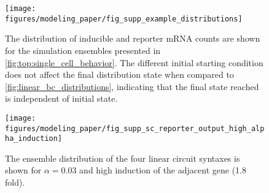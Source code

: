 \documentclass[11pt]{article}
\begin{document}
\begin{figure}[hbtp]
    \centering
    \texttt{[image: figures/modeling\_paper/fig\_supp\_example\_distributions]}
    \caption{The distribution of inducible and reporter mRNA counts are shown for the simulation ensembles presented in \cref{fig:top:single_cell_behavior}. The different initial starting condition does not affect the final distribution state when compared to \cref{fig:linear_bc_distributions}, indicating that the final state reached is independent of initial state.}
    \label{fig:supp:fig_examples_ensemble_behavior}
\end{figure}

\begin{figure}[hbtp]
    \centering
    \texttt{[image: figures/modeling\_paper/fig\_supp\_sc\_reporter\_output\_high\_alpha\_induction]}
    \caption{The ensemble distribution of the four linear circuit syntaxes is shown for \(\alpha = 0.03\) and high induction of the adjacent gene (1.8 fold).}
    \label{fig:supp:sc_distributions_high_alpha_induction}
\end{figure}
\end{document}
